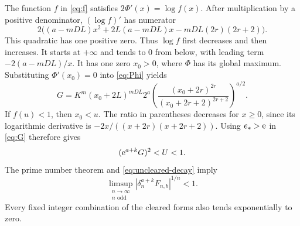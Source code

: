 The function $f$ in \eqref{eq:f} satisfies
$2\Phi'(x)=\log f(x)$. After multiplication by a positive
denominator, $(\log f)'$ has numerator
\[
 2\bigl((a-mDL)x^2+2L(a-mDL)x-mDL(2r)(2r+2)\bigr).
\]
This quadratic has one positive zero. Thus $\log f$ first
decreases and then increases. It starts at $+\infty$ and
tends to $0$ from below, with leading term $-2(a-mDL)/x$.
It has one zero $x_0>0$, where $\Phi$ has its global maximum.
Substituting $\Phi'(x_0)=0$ into \eqref{eq:Phi} yields
\begin{equation}\label{eq:G}
 G=K^m(x_0+2L)^{mDL}2^a
 \left(\frac{(x_0+2r)^{2r}}{(x_0+2r+2)^{2r+2}}\right)^{a/2}.
\end{equation}
If $f(u)<1$, then $x_0<u$. The ratio in parentheses decreases
for $x\ge0$, since its logarithmic derivative is
$-2x/((x+2r)(x+2r+2))$. Using $e_*>\mathrm e$ in \eqref{eq:G}
therefore gives
\[
 (\mathrm e^{a+k}G)^2<U<1.
\]
The prime number theorem and \eqref{eq:uncleared-decay} imply
\begin{equation}\label{eq:cleared-decay}
 \limsup_{\substack{n\to\infty\\n\text{ odd}}}
        |\delta_n^{a+k}F_{n,b}|^{1/n}<1.
\end{equation}
Every fixed integer combination of the cleared forms also
tends exponentially to zero.
